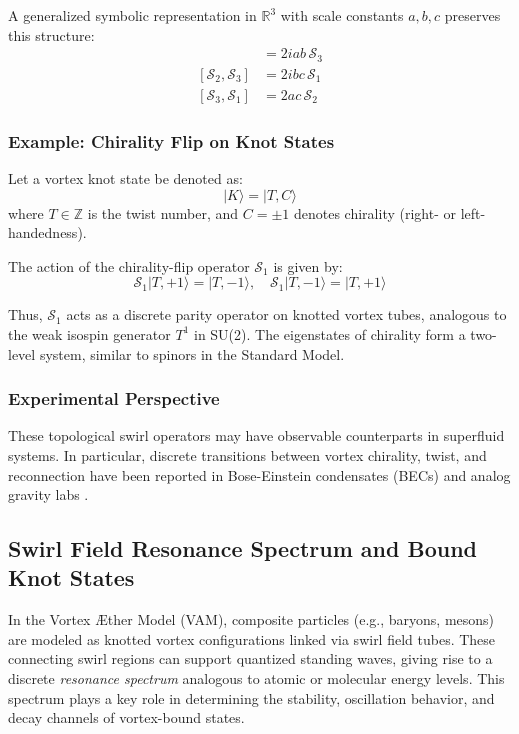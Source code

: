 A generalized symbolic representation in $\mathbb{R}^3$ with scale constants $a, b, c$ preserves this structure:
\begin{align}
[\mathcal{S}_1, \mathcal{S}_2] &= 2iab \, \mathcal{S}_3 \\
[\mathcal{S}_2, \mathcal{S}_3] &= 2ibc \, \mathcal{S}_1 \\
[\mathcal{S}_3, \mathcal{S}_1] &= 2ac \, \mathcal{S}_2
\end{align}

\subsubsection*{Example: Chirality Flip on Knot States}

Let a vortex knot state be denoted as:
\[
|K\rangle = |T, C\rangle
\]
where \( T \in \mathbb{Z} \) is the twist number, and \( C = \pm 1 \) denotes chirality (right- or left-handedness).

The action of the chirality-flip operator \( \mathcal{S}_1 \) is given by:
\[
\mathcal{S}_1 |T, +1\rangle = |T, -1\rangle, \quad
\mathcal{S}_1 |T, -1\rangle = |T, +1\rangle
\]

Thus, \( \mathcal{S}_1 \) acts as a discrete parity operator on knotted vortex tubes, analogous to the weak isospin generator \( T^1 \) in SU(2). The eigenstates of chirality form a two-level system, similar to spinors in the Standard Model.

\subsubsection*{Experimental Perspective}

These topological swirl operators may have observable counterparts in superfluid systems. In particular, discrete transitions between vortex chirality, twist, and reconnection have been reported in Bose-Einstein condensates (BECs) and analog gravity labs \cite{kleckner2013creation, ray2015observation}.

\subsection{Swirl Field Resonance Spectrum and Bound Knot States}

In the Vortex Æther Model (VAM), composite particles (e.g., baryons, mesons) are modeled as knotted vortex configurations linked via swirl field tubes. These connecting swirl regions can support quantized standing waves, giving rise to a discrete \textit{resonance spectrum} analogous to atomic or molecular energy levels. This spectrum plays a key role in determining the stability, oscillation behavior, and decay channels of vortex-bound states.

